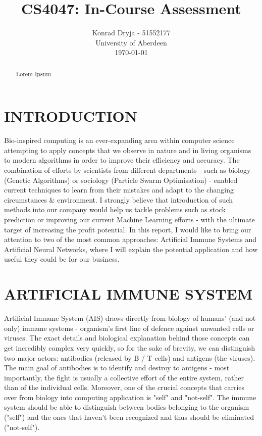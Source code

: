 \documentclass[letterpaper, 10 pt, conference]{ieeeconf}  %
\title{\LARGE \bf
CS4047: In-Course Assessment
}
\author{Konrad Dryja - 51552177 \\
  University of Aberdeen \\
  \today%
}
\begin{document}
\maketitle
\thispagestyle{empty}
\pagestyle{empty}


\begin{abstract}

Lorem Ipsum

\end{abstract}


\section{INTRODUCTION}

Bio-inspired computing is an ever-expanding area within computer science attempting to apply concepts that we observe in nature and in living organisms to modern algorithms in order to improve their efficiency and accuracy. The combination of efforts by scientists from different departments - such as biology (Genetic Algorithms) or sociology (Particle Swarm Optimisation) - enabled current techniques to learn from their mistakes and adapt to the changing circumstances \& environment. I strongly believe that introduction of such methods into our company would help us tackle problems such as stock prediction \cite{gunasekaran2011evaluation} or improving our current Machine Learning efforts - with the ultimate target of increasing the profit potential. In this report, I would like to bring our attention to two of the most common approaches: Artificial Immune Systems and Artificial Neural Networks, where I will explain the potential application and how useful they could be for our business.

\section{ARTIFICIAL IMMUNE SYSTEM}

Artificial Immune System (AIS) draws directly from biology of humans' (and not only) immune systems - organism's first line of defence against unwanted cells or viruses. The exact details and biological explanation behind those concepts can get incredibly complex very quickly, so for the sake of brevity, we can distinguish two major actors: antibodies (released by B / T cells) and antigens (the viruses). The main goal of antibodies is to identify and destroy to antigens - most importantly, the fight is usually a collective effort of the entire system, rather than of the individual cells. Moreover, one of the crucial concepts that carries over from biology into computing application is "self" and "not-self". The immune system should be able to distinguish between bodies belonging to the organism ("self") and the ones that haven't been recognized and thus should be eliminated ("not-self").
\end{document}
